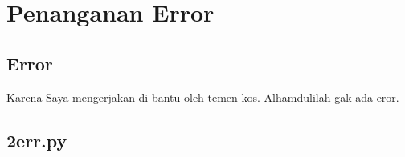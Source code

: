 \chapter{Penanganan Error}

\section{Error}
Karena Saya mengerjakan di bantu oleh temen kos. Alhamdulilah gak ada eror.

\section{2err.py}
